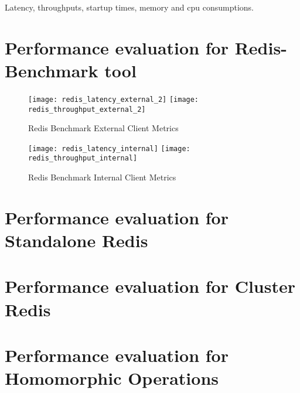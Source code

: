 Latency, throughputs, startup times, memory and cpu consumptions.

\section{Performance evaluation for Redis-Benchmark tool}
\label{sec:performance_evaluation_redis_benchmark_tool}

\begin{figure}[htbp]
  \centering
    {\texttt{[image: redis\_latency\_external\_2]}}%
    {\texttt{[image: redis\_throughput\_external\_2]}}%
  \caption{Redis Benchmark External Client Metrics}
  \label{fig:redis_benchmark_external_metrics}
\end{figure}

\begin{figure}[htbp]
  \centering
    {\texttt{[image: redis\_latency\_internal]}}%
    {\texttt{[image: redis\_throughput\_internal]}}%
  \caption{Redis Benchmark Internal Client Metrics}
  \label{fig:redis_benchmark_internal_metrics}
\end{figure}


\section{Performance evaluation for Standalone Redis}
\label{sec:performance_evaluation_standalone_redis}

\section{Performance evaluation for Cluster Redis}
\label{sec:performance_evaluation_cluster_redis}

\section{Performance evaluation for Homomorphic Operations}
\label{sec:performance_evaluation_homomorphic_operations}

